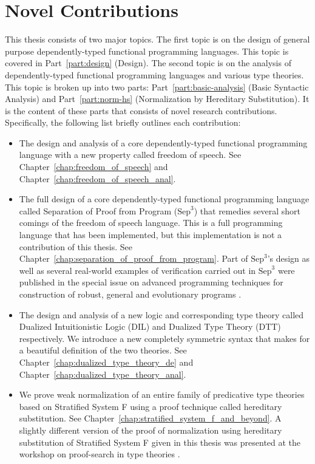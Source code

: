 \documentclass[phd,appendix,dedicationpage,ackpage,epigraphpage]{uithesis}
\newcommand{\Sep}[0]{\text{Sep}^3}
\begin{document}
\section{Novel Contributions}
\label{sec:novel_contributions}
This thesis consists of two major topics.  The first topic is on the
design of general purpose dependently-typed functional programming
languages. This topic is covered in Part~\ref{part:design} (Design).
The second topic is on the analysis of dependently-typed functional
programming languages and various type theories.  This topic is broken
up into two parts: Part~\ref{part:basic-analysis} (Basic Syntactic
Analysis) and Part~\ref{part:norm-hs} (Normalization by Hereditary
Substitution).  It is the content of these parts that consists of
novel research contributions. Specifically, the following list briefly
outlines each contribution:
\begin{itemize}
\item The design and analysis of a core dependently-typed functional
  programming language with a new property called freedom of
  speech. See Chapter~\ref{chap:freedom_of_speech} and
  Chapter~\ref{chap:freedom_of_speech_anal}.

\item The full design of a core dependently-typed functional
  programming language called Separation of Proof from Program
  ($\Sep$) that remedies several short comings of the freedom of
  speech language.  This is a full programming language that has been
  implemented, but this implementation is not a contribution of this
  thesis.  See Chapter~\ref{chap:separation_of_proof_from_program}.
  Part of $\Sep$'s design as well as several real-world examples of
  verification carried out in $\Sep$ were published in the special
  issue on advanced programming techniques for construction of robust,
  general and evolutionary programs \cite{Kimmel:2012}.

\item The design and analysis of a new logic and corresponding type
  theory called Dualized Intuitionistic Logic (DIL) and Dualized Type
  Theory (DTT) respectively. We introduce a new completely symmetric
  syntax that makes for a beautiful definition of the two theories.
  See Chapter~\ref{chap:dualized_type_theory_de} and
  Chapter~\ref{chap:dualized_type_theory_anal}.

\item We prove weak normalization of an entire family of predicative
  type theories based on Stratified System F using a proof technique
  called hereditary substitution. See
  Chapter~\ref{chap:stratified_system_f_and_beyond}.  A slightly
  different version of the proof of normalization using hereditary
  substitution of Stratified System F given in this thesis was
  presented at the workshop on proof-search in type theories
  \cite{Eades:2010}.


\end{itemize}
\end{document}
